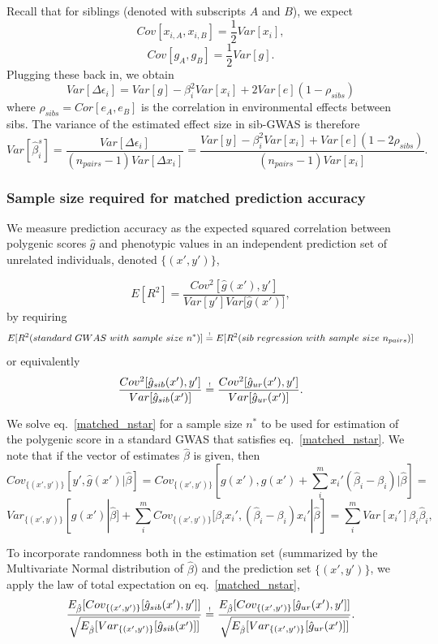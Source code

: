 \documentclass[hidelinks, 12pt]{article}
\begin{document}
Recall that for siblings (denoted with subscripts $A$ and $B$), we expect
$$Cov[x_{i,A},x_{i,B}]=\frac{1}{2}Var[x_i],$$
$$Cov[g_A,g_B]=\frac{1}{2}Var[g].$$
Plugging these back in, we obtain
$$Var[\Delta \epsilon_i] = Var[g] - \beta_i^2Var[x_i] + 2Var[e](1-\rho_{sibs}) $$
where $\rho_{sibs} = Cor[e_A,e_B]$ is the correlation in environmental effects between sibs. The variance of the estimated effect size in sib-GWAS is therefore
\begin{equation}
\label{var_beta_hat_sibs}
Var[\hat{\beta}^{s}_i]=\frac{Var[\Delta \epsilon_i]}{(n_{pairs}-1) Var[\Delta x_i]} = \frac{Var[y] - \beta_i^2Var[x_i] + Var[e](1-2\rho_{sibs})}{(n_{pairs}-1) Var[x_i]}.
\end{equation}


\subsubsection{Sample size required for matched prediction accuracy}

We measure prediction accuracy as the expected squared correlation between polygenic scores $\hat{g}$ and phenotypic values in an independent prediction set of unrelated individuals, denoted $\{(x',y')\}$,

$$E[R^2] = \frac{Cov^2[\hat{g}(x'),y']}{{Var[y']Var[\hat{g}(x')}]},$$
by requiring 
\newcommand\reqeq{\mathrel{\stackrel{\makebox[0pt]{\mbox{\normalfont\tiny !}}}{=}}}
$$E[R^2(standard~GWAS~with~sample~size~n^*)] \reqeq E[R^2(sib~regression~with~sample~size~n_{pairs})]$$
or equivalently
\begin{equation}
\label{matched_nstar}
\frac{Cov^2[\hat{g}_{sib}(x'),y']}{{Var[\hat{g}_{sib}(x')]}} \reqeq \frac{Cov^2[\hat{g}_{ur}(x'),y']}{{Var[\hat{g}_{ur}(x')]}}.
\end{equation}

We solve eq.~\ref{matched_nstar} for a sample size $n^*$ to be used for estimation of the polygenic score in a standard GWAS that satisfies eq.~\ref{matched_nstar}.  We note that if the vector of estimates $\hat{\beta}$ is given, then
$$Cov_{\{(x',y')\}}[y',\hat{g}(x')|\hat{\beta}]=Cov_{\{(x',y')\}}[g(x'),g(x')+\sum_i^m{x_i'(\hat{\beta}_i-\beta_i)}|\hat{\beta}] = $$
\begin{equation}
\label{covgy_tag_simple}
Var_{\{(x',y')\}}[g(x')|\hat{\beta}]+\sum_i^m{Cov_{\{(x',y')\}}[\beta_ix_i',(\hat{\beta}_i-\beta_i)x_i'}|\hat{\beta}]=\sum_i^mVar[x_i']\beta_i\hat{\beta}_i,
\end{equation}

To incorporate randomness both in the estimation set (summarized by the Multivariate Normal distribution of $\hat{\beta}$) and the prediction set $\{(x',y')\}$, we apply the law of total expectation on eq.~\ref{matched_nstar}, 
\begin{equation}
\label{requirement_nstar_new}
\frac{E_{\hat{\beta}}[Cov_{\{(x',y')\}}[\hat{g}_{sib}(x'),y']]}{\sqrt{E_{\hat{\beta}}[Var_{\{(x',y')\}}[\hat{g}_{sib}(x')]]}} \reqeq \frac{E_{\hat{\beta}}[Cov_{\{(x',y')\}}[\hat{g}_{ur}(x'),y']]}{\sqrt{E_{\hat{\beta}}[Var_{\{(x',y')\}}[\hat{g}_{ur}(x')]]}}.
\end{equation}
\end{document}
